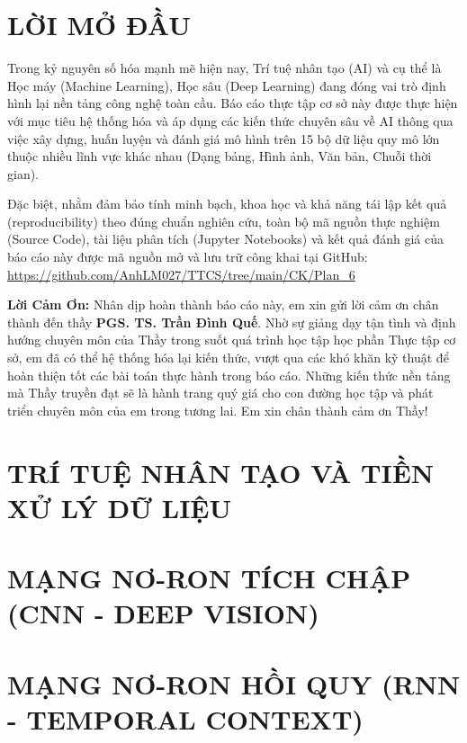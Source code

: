 \documentclass[12pt, a4paper]{article}
\begin{document}
\tableofcontents
\newpage

\section*{LỜI MỞ ĐẦU}
Trong kỷ nguyên số hóa mạnh mẽ hiện nay, Trí tuệ nhân tạo (AI) và cụ thể là Học máy (Machine Learning), Học sâu (Deep Learning) đang đóng vai trò định hình lại nền tảng công nghệ toàn cầu. Báo cáo thực tập cơ sở này được thực hiện với mục tiêu hệ thống hóa và áp dụng các kiến thức chuyên sâu về AI thông qua việc xây dựng, huấn luyện và đánh giá mô hình trên 15 bộ dữ liệu quy mô lớn thuộc nhiều lĩnh vực khác nhau (Dạng bảng, Hình ảnh, Văn bản, Chuỗi thời gian). 

Đặc biệt, nhằm đảm bảo tính minh bạch, khoa học và khả năng tái lập kết quả (reproducibility) theo đúng chuẩn nghiên cứu, toàn bộ mã nguồn thực nghiệm (Source Code), tài liệu phân tích (Jupyter Notebooks) và kết quả đánh giá của báo cáo này được mã nguồn mở và lưu trữ công khai tại GitHub: \url{https://github.com/AnhLM027/TTCS/tree/main/CK/Plan_6}

\textbf{Lời Cảm Ơn:} Nhân dịp hoàn thành báo cáo này, em xin gửi lời cảm ơn chân thành đến thầy \textbf{PGS. TS. Trần Đình Quế}. Nhờ sự giảng dạy tận tình và định hướng chuyên môn của Thầy trong suốt quá trình học tập học phần Thực tập cơ sở, em đã có thể hệ thống hóa lại kiến thức, vượt qua các khó khăn kỹ thuật để hoàn thiện tốt các bài toán thực hành trong báo cáo. Những kiến thức nền tảng mà Thầy truyền đạt sẽ là hành trang quý giá cho con đường học tập và phát triển chuyên môn của em trong tương lai. Em xin chân thành cảm ơn Thầy!

\newpage

\section{TRÍ TUỆ NHÂN TẠO VÀ TIỀN XỬ LÝ DỮ LIỆU}

\newpage

\section{MẠNG NƠ-RON TÍCH CHẬP (CNN - DEEP VISION)}

\newpage

\section{MẠNG NƠ-RON HỒI QUY (RNN - TEMPORAL CONTEXT)}

\newpage
\end{document}
